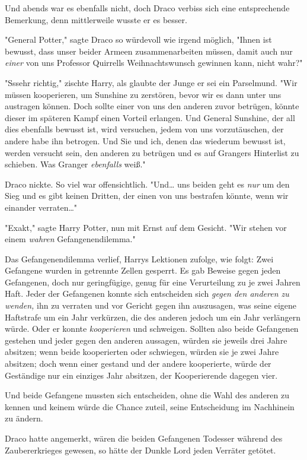 {Und abends war es ebenfalls nicht, doch Draco verbiss sich eine entsprechende Bemerkung, denn mittlerweile wusste er es besser.

"General Potter," sagte Draco so würdevoll wie irgend möglich, "Ihnen ist bewusst, dass unser beider Armeen zusammenarbeiten müssen, damit auch nur \emph{einer} von uns Professor Quirrells Weihnachtswunsch gewinnen kann, nicht wahr?"

"Sssehr richtig," zischte Harry, als glaubte der Junge er sei ein Parselmund. "Wir müssen kooperieren, um Sunshine zu zerstören, bevor wir es dann unter uns austragen können. Doch sollte einer von uns den anderen zuvor betrügen, könnte dieser im späteren Kampf einen Vorteil erlangen. Und General Sunshine, der all dies ebenfalls bewusst ist, wird versuchen, jedem von uns vorzutäuschen, der andere habe ihn betrogen. Und Sie und ich, denen das wiederum bewusst ist, werden versucht sein, den anderen zu betrügen und es auf Grangers Hinterlist zu schieben. Was Granger \emph{ebenfalls} weiß."

Draco nickte. So viel war offensichtlich. "Und… uns beiden geht es \emph{nur} um den Sieg und es gibt keinen Dritten, der einen von uns bestrafen könnte, wenn wir einander verraten…"

"Exakt," sagte Harry Potter, nun mit Ernst auf dem Gesicht. "Wir stehen vor einem \emph{wahren} Gefangenendilemma."

Das Gefangenendilemma verlief, Harrys Lektionen zufolge, wie folgt: Zwei Gefangene wurden in getrennte Zellen gesperrt. Es gab Beweise gegen jeden Gefangenen, doch nur geringfügige, genug für eine Verurteilung zu je zwei Jahren Haft. Jeder der Gefangenen konnte sich entscheiden sich \emph{gegen den anderen zu wenden,} ihn zu verraten und vor Gericht gegen ihn auszusagen, was seine eigene Haftstrafe um ein Jahr verkürzen, die des anderen jedoch um ein Jahr verlängern würde. Oder er konnte \emph{kooperieren} und schweigen. Sollten also beide Gefangenen gestehen und jeder gegen den anderen aussagen, würden sie jeweils drei Jahre absitzen; wenn beide kooperierten oder schwiegen, würden sie je zwei Jahre absitzen; doch wenn einer gestand und der andere kooperierte, würde der Geständige nur ein einziges Jahr absitzen, der Kooperierende dagegen vier.

Und beide Gefangene mussten sich entscheiden, ohne die Wahl des anderen zu kennen und keinem würde die Chance zuteil, seine Entscheidung im Nachhinein zu ändern.

Draco hatte angemerkt, wären die beiden Gefangenen Todesser während des Zaubererkrieges gewesen, so hätte der Dunkle Lord jeden Verräter getötet.

}
